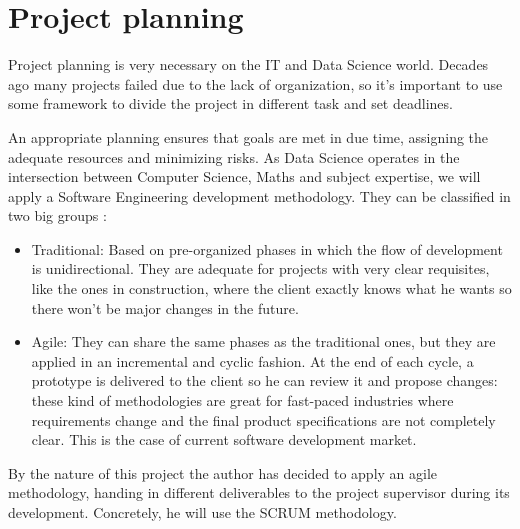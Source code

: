 \chapter{Project planning}
Project planning is very necessary on the IT and Data Science world. Decades ago many projects failed due to the lack of organization, so it's important to use some framework to divide the project in different task and set deadlines.

An appropriate planning ensures that goals are met in due time, assigning the adequate resources and minimizing risks. As Data Science operates in the intersection between Computer Science, Maths and subject expertise, we will apply a Software Engineering development methodology.
They can be classified in two big groups \cite{traditional-vs-agile}:
\begin{itemize}
    \item Traditional: Based on pre-organized phases in which the flow of development is unidirectional. They are adequate for projects with very clear requisites, like the ones in construction, where the client exactly knows what he wants so there won't be major changes in the future.
    \item Agile: They can share the same phases as the traditional ones, but they are applied in an incremental and cyclic fashion. At the end of each cycle, a prototype is delivered to the client so he can review it and propose changes: these kind of methodologies are great for fast-paced industries where requirements change and the final product specifications are not completely clear. This is the case of current software development market.
\end{itemize}
By the nature of this project the author has decided to apply an agile methodology, handing in different deliverables to the project supervisor during its development. Concretely, he will use the SCRUM methodology.

